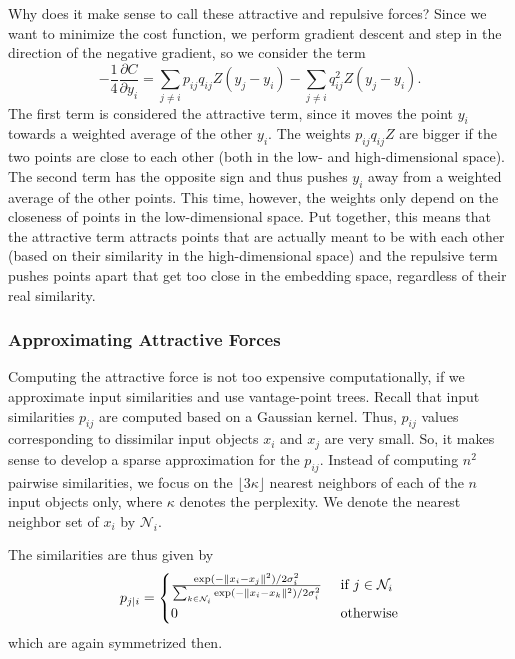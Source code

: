 Why does it make sense to call these attractive and repulsive forces? Since we want to minimize the cost function, we perform gradient descent and step in the direction of the negative gradient, so we consider the term
\begin{equation}
   - \frac{1}{4} \frac{\partial C}{\partial y_i} = \sum_{j \neq i } p_{ij} q_{ij} Z (y_j - y_i) - \sum_{j \neq i} q_{ij}^2 Z (y_j - y_i).  
\end{equation}
The first term is considered the attractive term, since it moves the point $y_i$ towards a weighted average of the other $y_i$. 
The weights $p_{ij} q_{ij} Z$ are bigger if the two points are close to each other (both in the low- and high-dimensional space). 
The second term has the opposite sign and thus pushes $y_i$ away from a weighted average of the other points. This time, however, the weights only depend on the closeness of points in the low-dimensional space. 
Put together, this means that the attractive term attracts points that are actually meant to be with each other (based on their similarity in the high-dimensional space) and the repulsive term pushes points apart that get too close in the embedding space, regardless of their real similarity. 

\subsubsection{Approximating Attractive Forces}
Computing the attractive force is not too expensive computationally, if we approximate input similarities and use vantage-point trees. Recall that input similarities $p_{ij}$ are computed based on a Gaussian kernel. 
Thus, $p_{ij}$ values corresponding to dissimilar input objects $x_i$ and $x_j$ are very small. 
So, it makes sense to develop a sparse approximation for the $p_{ij}$. Instead of computing $n^2$ pairwise similarities, we focus on the $\lfloor 3 \kappa \rfloor$ nearest neighbors of each of the $n$ input objects only, where $\kappa$ denotes the perplexity. We denote the nearest neighbor set of $x_i$ by $\mathcal{N}_i$. 

The similarities are thus given by 
\begin{equation}
    p_{j|i} = \begin{cases}
    \frac{\exp(-\lVert x_i - x_j\rVert^2) / 2 \sigma_i^2}{\sum_{k \in \mathcal{N}_i} \exp(-\lVert x_i - x_k\rVert^2) / 2 \sigma_i^2} & \text{ if } j \in \mathcal{N}_i \\
    0  & \text{ otherwise}
    \end{cases}
\end{equation}
which are again symmetrized then. 

